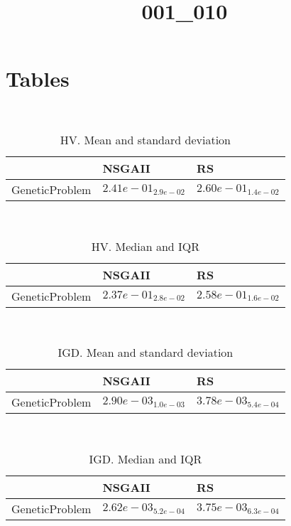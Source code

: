 \documentclass{article}
\title{001_010}
\author{}
\begin{document}
\maketitle
\section{Tables}
\
\begin{table}
\caption{HV. Mean and standard deviation}
\label{table:mean.HV}
\centering
\begin{scriptsize}
\begin{tabular}{lll}
\hline & NSGAII &  RS\\
\hline
GeneticProblem & \cellcolor{gray25}$  2.41e-01_{ 2.9e-02}$ & \cellcolor{gray95}$  2.60e-01_{ 1.4e-02}$ \\
\hline
\end{tabular}
\end{scriptsize}
\end{table}
\
\begin{table}
\caption{HV. Median and IQR}
\label{table:median.HV}
\begin{scriptsize}
\centering
\begin{tabular}{lll}
\hline & NSGAII &  RS\\
\hline
GeneticProblem & \cellcolor{gray25}$  2.37e-01_{ 2.8e-02}$ & \cellcolor{gray95}$  2.58e-01_{ 1.6e-02}$ \\
\hline
\end{tabular}
\end{scriptsize}
\end{table}
\
\begin{table}
\caption{IGD. Mean and standard deviation}
\label{table:mean.IGD}
\centering
\begin{scriptsize}
\begin{tabular}{lll}
\hline & NSGAII &  RS\\
\hline
GeneticProblem & \cellcolor{gray95}$  2.90e-03_{ 1.0e-03}$ & $  3.78e-03_{ 5.4e-04}$ \\
\hline
\end{tabular}
\end{scriptsize}
\end{table}
\
\begin{table}
\caption{IGD. Median and IQR}
\label{table:median.IGD}
\begin{scriptsize}
\centering
\begin{tabular}{lll}
\hline & NSGAII &  RS\\
\hline
GeneticProblem & \cellcolor{gray95}$  2.62e-03_{ 5.2e-04}$ & $  3.75e-03_{ 6.3e-04}$ \\
\hline
\end{tabular}
\end{scriptsize}
\end{table}
\end{document}
